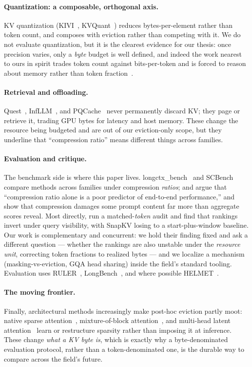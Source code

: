 \paragraph{Quantization: a composable, orthogonal axis.}
KV quantization (KIVI~\cite{liu2024kivi}, KVQuant~\cite{hooper2024kvquant}) reduces bytes-per-element
rather than token count, and composes with eviction rather than competing with it. We do not evaluate
quantization, but it is the clearest evidence for our thesis: once precision varies, only a
\emph{byte} budget is well defined, and indeed the work nearest to ours in spirit trades token count
against bits-per-token and is forced to reason about memory rather than token fraction~\cite{zhang2024tokenprecision}.

\paragraph{Retrieval and offloading.}
Quest~\cite{tang2024quest}, InfLLM~\cite{xiao2024infllm}, and PQCache~\cite{zhang2025pqcache} never
permanently discard KV; they page or retrieve it, trading GPU bytes for latency and host memory.
These change the resource being budgeted and are out of our eviction-only scope, but they underline
that ``compression ratio'' means different things across families.

\paragraph{Evaluation and critique.}
The benchmark side is where this paper lives. longctx\_bench~\cite{yuan2024longctxbench} and
SCBench~\cite{li2025scbench} compare methods across families under compression \emph{ratios};
\citet{gao2025rethinking} and \citet{agrawal2026benchmarking} argue that ``compression ratio alone is
a poor predictor of end-to-end performance,'' and \citet{chen2026pitfalls} show that compression
damages some prompt content far more than aggregate scores reveal. Most directly,
\citet{luo2026queryvisibility} run a matched-\emph{token} audit and find that rankings invert under
query visibility, with SnapKV losing to a start-plus-window baseline. Our work is complementary and
concurrent: we hold their finding fixed and ask a different question --- whether the rankings are also
unstable under the \emph{resource unit}, correcting token fractions to realized bytes --- and we
localize a mechanism (masking-vs-eviction, GQA head sharing) inside the field's standard tooling.
Evaluation uses RULER~\cite{hsieh2024ruler}, LongBench~\cite{bai2024longbench}, and where possible
HELMET~\cite{yen2025helmet}.

\paragraph{The moving frontier.}
Finally, architectural methods increasingly make post-hoc eviction partly moot: native sparse
attention~\cite{yuan2025nsa}, mixture-of-block attention~\cite{lu2025moba}, and multi-head latent
attention~\cite{deepseek2024v2} learn or restructure sparsity rather than imposing it at inference.
These change \emph{what a KV byte is}, which is exactly why a byte-denominated evaluation protocol,
rather than a token-denominated one, is the durable way to compare across the field's future.
